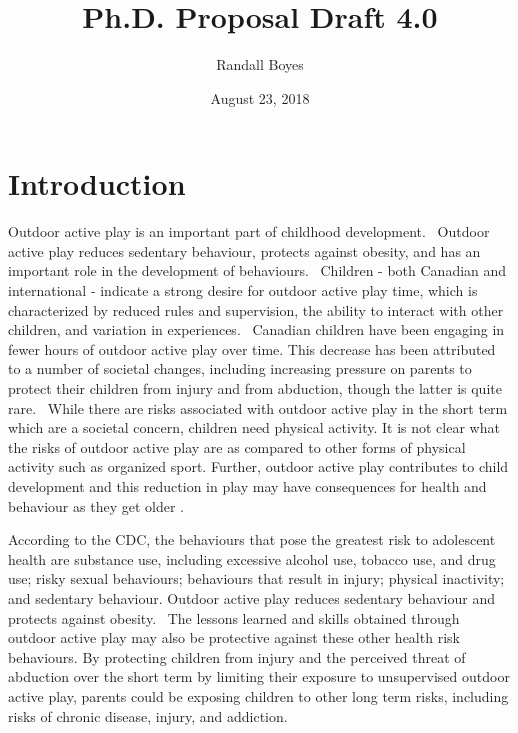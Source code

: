 \documentclass [11pt]{article}
\title{Ph.D. Proposal Draft 4.0}
\author{Randall Boyes}
\date{August 23, 2018}
\begin{document}
\maketitle


\section{Introduction}
Outdoor active play is an important part of childhood development.~\cite{Curtis2012-ql,Pearce2008-lq,Pernsteiner2012-qm} Outdoor active play reduces sedentary behaviour, protects against obesity, and has an important role in the development of behaviours.~\cite{Ansari2015-ig} Children - both Canadian and international - indicate a strong desire for outdoor active play time, which is characterized by reduced rules and supervision, the ability to interact with other children, and variation in experiences.~\cite{Watson2016-qd,Caro2016-er,Herrington2015-pb} Canadian children have been engaging in fewer hours of outdoor active play over time. This decrease has been attributed to a number of societal changes, including increasing pressure on parents to protect their children from injury and from abduction, though the latter is quite rare.~\cite{Mitra2014-qg} While there are risks associated with outdoor active play in the short term which are a societal concern, children need physical activity. It is not clear what the risks of outdoor active play are as compared to other forms of physical activity such as organized sport. Further, outdoor active play contributes to child development and this reduction in play may have consequences for health and behaviour as they get older \cite{barker2014less}. 

According to the CDC, the behaviours that pose the greatest risk to adolescent health are substance use, including excessive alcohol use, tobacco use, and drug use; risky sexual behaviours; behaviours that result in injury; physical inactivity; and sedentary behaviour. Outdoor active play reduces sedentary behaviour and protects against obesity.~\cite{Ansari2015-ig} The lessons learned and skills obtained through outdoor active play may also be protective against these other health risk behaviours. By protecting children from injury and the perceived threat of abduction over the short term by limiting their exposure to unsupervised outdoor active play, parents could be exposing children to other long term risks, including risks of chronic disease, injury, and addiction.
\end{document}
